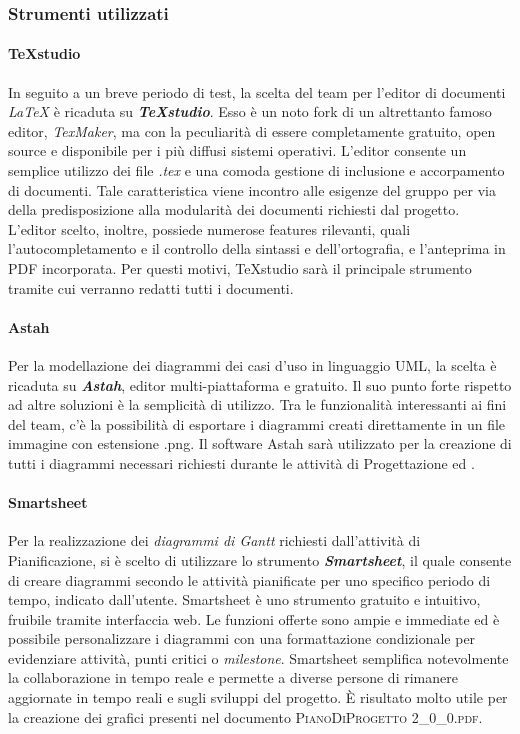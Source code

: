 	\subsubsection{Strumenti utilizzati}
	
		\paragraph{TeXstudio}
		In seguito a un breve periodo di test, la scelta del team per l'editor di documenti \textit{\LaTeX{}} è ricaduta su \textit{\textbf{TeXstudio}}. Esso è un noto fork di un altrettanto famoso editor, \textit{TexMaker}, ma con la peculiarità di essere completamente gratuito, open source e disponibile per i più diffusi sistemi operativi. L'editor consente un semplice utilizzo dei file \textit{.tex} e una comoda gestione di inclusione e accorpamento di documenti. Tale caratteristica viene incontro alle esigenze del gruppo per via della predisposizione alla modularità dei documenti richiesti dal progetto. L'editor scelto, inoltre, possiede numerose features rilevanti, quali l'autocompletamento e il controllo della sintassi e dell'ortografia, e l'anteprima in PDF incorporata. Per questi motivi, TeXstudio sarà il principale strumento tramite cui verranno redatti tutti i documenti.
	
		\paragraph{Astah}
		Per la modellazione dei diagrammi dei casi d'uso in linguaggio UML, la scelta è ricaduta su \textit{\textbf{Astah}}, editor multi-piattaforma e gratuito. Il suo punto forte rispetto ad altre soluzioni è la semplicità di utilizzo. Tra le funzionalità interessanti ai fini del team, c'è la possibilità di esportare i diagrammi creati direttamente in un file immagine con estensione .png. Il software Astah sarà utilizzato per la creazione di tutti i diagrammi necessari richiesti durante le attività di Progettazione ed \AdR.
		
		\paragraph{Smartsheet}
		Per la realizzazione dei \textit{diagrammi di Gantt} richiesti dall'attività di Pianificazione, si è scelto di utilizzare lo strumento \textit{\textbf{Smartsheet}}, il quale consente di creare diagrammi secondo le attività pianificate per uno specifico periodo di tempo, indicato dall'utente.
		Smartsheet è uno strumento gratuito e intuitivo, fruibile tramite interfaccia web. Le funzioni offerte sono ampie e immediate ed è possibile personalizzare i diagrammi con una formattazione condizionale per evidenziare attività, punti critici o \textit{milestone}. Smartsheet semplifica notevolmente la collaborazione in tempo reale e permette a diverse persone di rimanere aggiornate in tempo reali e sugli sviluppi del progetto. \MakeUppercase{è} risultato molto utile per la creazione dei grafici presenti nel documento \textsc{PianoDiProgetto 2\_0\_0.pdf}.
		
